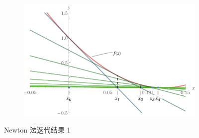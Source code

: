 \documentclass[11pt]{article}
\begin{document}
\begin{figure}
\begin{subfigure}[t]{\textwidth}
        \includegraphics[scale = 0.8]{Figure/Newton1.pdf}
        \label{figure:Newton1}
    \end{subfigure}
    \caption{Newton 法迭代结果 1 }
    \label{Newton1}
\end{figure}
\end{document}
